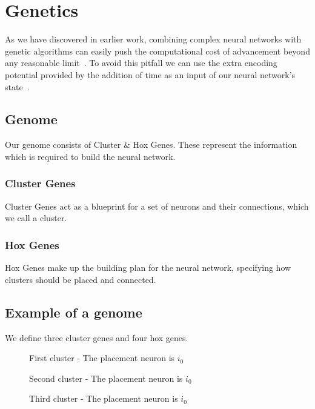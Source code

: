 \section{Genetics}

As we have discovered in earlier work, combining complex neural networks 
with genetic algorithms can easily push the computational cost of advancement
beyond any reasonable limit~\cite{Ferner2017}.
To avoid this pitfall we can use the extra encoding potential provided by 
the addition of time as an input of our neural network's state~\cite{Paugam-Moisy2012}.

\subsection{Genome}
Our genome consists of Cluster \& Hox Genes.
These represent the information which is required to build the neural network.

\subsubsection{Cluster Genes}
Cluster Genes act as a blueprint for a set of neurons and their connections, which we call a cluster.

\subsubsection{Hox Genes}
Hox Genes make up the building plan for the neural network,
specifying how clusters should be placed and connected.

\newpage

\label{Example of a genome}
\subsection{Example of a genome}
We define three cluster genes and four hox genes.

\begin{figure}[H]
    \centering
    
    \caption{First cluster - The placement neuron is $i_0$}
\end{figure}
\begin{figure}[H]
    \centering
    
    \caption{Second cluster - The placement neuron is $i_0$}
\end{figure}
\begin{figure}[H]
    \centering
    
    \caption{Third cluster - The placement neuron is $i_0$}
\end{figure}

